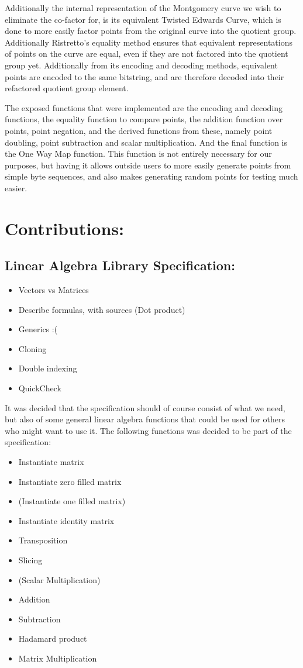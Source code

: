 \documentclass{article}
\begin{document}
Additionally the internal representation of the Montgomery curve we wish
to eliminate the co-factor for, is its equivalent Twisted Edwards Curve,
which is done to more easily factor points from the original curve into
the quotient group. Additionally Ristretto's equality method ensures
that equivalent representations of points on the curve are equal, even
if they are not factored into the quotient group yet. Additionally
from its encoding and decoding methods, equivalent points are encoded
to the same bitstring, and are therefore decoded into their refactored
quotient group element.

The exposed functions that were implemented are the encoding and decoding
functions, the equality function to compare points, the addition function
over points, point negation, and the derived functions from these,
namely point doubling, point subtraction and scalar multiplication. And
the final function is the One Way Map function. This function is not
entirely necessary for our purposes, but having it allows outside users
to more easily generate points from simple byte sequences, and 
also makes generating random points for testing much easier.

\section{Contributions:}

\subsection{Linear Algebra Library Specification:}
\begin{itemize}
	\item Vectors vs Matrices 
	\item Describe formulas, with sources (Dot product) 
	\item Generics :(
	\item Cloning
	\item Double indexing
	\item QuickCheck
\end{itemize} 

It was decided that the specification should of course consist of what we
need, but also of some general linear algebra functions that could be
used for others who might want to use it. The following functions was
decided to be part of the specification:

\begin{itemize}
	\item Instantiate matrix
	\item Instantiate zero filled matrix
	\item (Instantiate one filled matrix)
	\item Instantiate identity matrix
	\item Transposition
	\item Slicing
	\item (Scalar Multiplication)
	\item Addition
	\item Subtraction
	\item Hadamard product
	\item Matrix Multiplication
\end{itemize}
\end{document}
